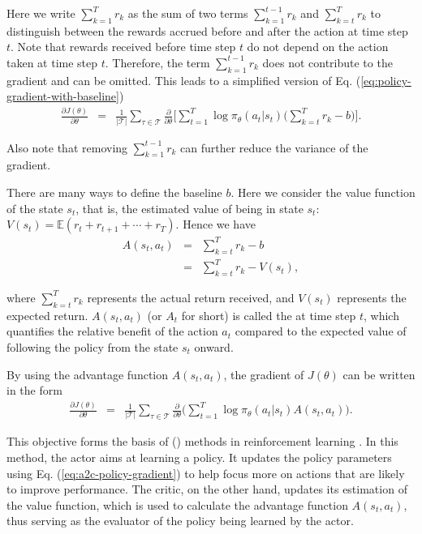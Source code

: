\noindent Here we write $\sum_{k=1}^{T} r_k$ as the sum of two terms $\sum_{k=1}^{t-1} r_k$ and $\sum_{k=t}^{T} r_k$ to distinguish between the rewards accrued before and after the action at time step $t$. Note that rewards received before time step $t$ do not depend on the action taken at time step $t$. Therefore, the term $\sum_{k=1}^{t-1} r_k$ does not contribute to the gradient and can be omitted. This leads to a simplified version of Eq. (\ref{eq:policy-gradient-with-baseline})
\begin{eqnarray}
\frac{\partial J(\theta)}{\partial \theta} & = & \frac{1}{|\mathcal{T}|} \sum_{\tau \in \mathcal{T}} \frac{\partial}{\partial \theta} \Big[ \sum_{t=1}^{T} \log \pi_{\theta}(a_t|s_t) \Big(\sum_{k=t}^{T} r_k - b \Big) \Big].
\end{eqnarray}

\noindent Also note that removing $\sum_{k=1}^{t-1} r_k$ can further reduce the variance of the gradient.

There are many ways to define the baseline $b$. Here we consider the value function of the state $s_t$, that is, the estimated value of being in state $s_t$: $V(s_t) = \mathbb{E}(r_t + r_{t+1} + \cdots + r_{T})$. Hence we have
\begin{eqnarray}
A(s_t,a_t) & = & \sum_{k=t}^{T} r_k - b \nonumber \\
           & = & \sum_{k=t}^{T} r_k - V(s_t),
\end{eqnarray}

\noindent where $\sum_{k=t}^{T} r_k $ represents the actual return received, and $V(s_t)$ represents the expected return. $A(s_t,a_t)$ (or $A_t$ for short) is called the  at time step $t$, which quantifies the relative benefit of the action $a_t$ compared to the expected value of following the policy from the state $s_t$ onward.

By using the advantage function $A(s_t,a_t)$, the gradient of $J(\theta)$ can be written in the form
\begin{eqnarray}
\frac{\partial J(\theta)}{\partial \theta} & = & \frac{1}{|\mathcal{T}|} \sum_{\tau \in \mathcal{T}} \frac{\partial}{\partial \theta} \Big( \sum_{t=1}^{T} \log \pi_{\theta}(a_t|s_t) A(s_t,a_t) \Big). \label{eq:a2c-policy-gradient}
\end{eqnarray}

This objective forms the basis of  () methods in reinforcement learning \cite{mnih-etal:2016asynchronous}. In this method, the actor aims at learning a policy. It updates the policy parameters using Eq. (\ref{eq:a2c-policy-gradient}) to help focus more on actions that are likely to improve performance. The critic, on the other hand, updates its estimation of the value function, which is used to calculate the advantage function $A(s_t,a_t)$, thus serving as the evaluator of the policy being learned by the actor.

